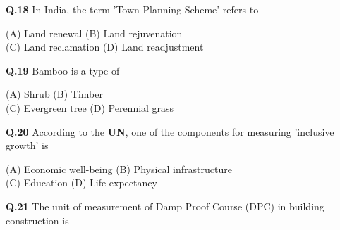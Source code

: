 \documentclass[journal,12pt,onecolumn]{IEEEtran}
\theoremstyle{remark}
\begin{document}
\vspace{0.5cm}

\textbf{Q.18} \hspace{0.3cm} In India, the term 'Town Planning Scheme' refers to

\begin{flushleft}
    

\hspace{1.8cm}(A) Land renewal \hspace{2.655cm} (B) Land rejuvenation \\
\hspace{1.8cm}(C) Land reclamation \hspace{2.04cm} (D) Land readjustment 
\end{flushleft}

\vspace{0.5cm}

\textbf{Q.19} \hspace{0.3cm} Bamboo is a type of

\begin{flushleft}

\hspace{1.8cm}(A) Shrub \hspace{3.9cm} (B) Timber \\
\hspace{1.8cm}(C) Evergreen tree \hspace{2.6cm} (D) Perennial grass 
\end{flushleft}

\vspace{0.5cm}

\textbf{Q.20} \hspace{0.3cm} According to the \textbf{UN}, one of the components for measuring 'inclusive growth' is

\begin{flushleft}
    
\hspace{1.8cm}(A) Economic well-being \hspace{1.7cm} (B) Physical infrastructure \\
\hspace{1.8cm}(C) Education \hspace{3.3cm} (D) Life expectancy 
\end{flushleft}

\vspace{0.5cm}

\textbf{Q.21} \hspace{0.3cm} The unit of measurement of Damp Proof Course (DPC) in building construction is
\end{document}
